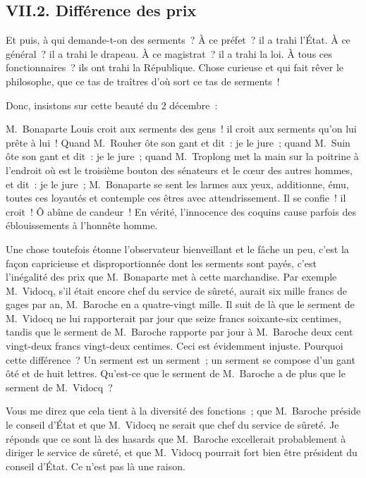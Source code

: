\documentclass[french,twoside]{book} %
\begin{document}
\subsection[{VII.2. Différence des prix}]{VII.2. Différence des prix}
\noindent Et puis, à qui demande-t-on des serments ? À ce préfet ? il a trahi l’État. À ce général ? il a trahi le drapeau. À ce magistrat ? il a trahi la loi. À tous ces fonctionnaires ? ils ont trahi la République. Chose curieuse et qui fait rêver le philosophe, que ce tas de traîtres d’où sort ce tas de serments !\par
Donc, insistons sur cette beauté du 2 décembre :\par
M. Bonaparte Louis croit aux serments des gens ! il croit aux serments qu’on lui prête à lui ! Quand M. Rouher ôte son gant et dit : je le jure ; quand M. Suin ôte son gant et dit : je le jure ; quand M. Troplong met la main sur la poitrine à l’endroit où est le troisième bouton des sénateurs et le cœur des autres hommes, et dit : je le jure ; M. Bonaparte se sent les larmes aux yeux, additionne, ému, toutes ces loyautés et contemple ces êtres avec attendrissement. Il se confie ! il croit ! Ô abîme de candeur ! En vérité, l’innocence des coquins cause parfois des éblouissements à l’honnête homme.\par
Une chose toutefois étonne l’observateur bienveillant et le fâche un peu, c’est la façon capricieuse et disproportionnée dont les serments sont payés, c’est l’inégalité des prix que M. Bonaparte met à cette marchandise. Par exemple M. Vidocq, s’il était encore chef du service de sûreté, aurait six mille francs de gages par an, M. Baroche en a quatre-vingt mille. Il suit de là que le serment de M. Vidocq ne lui rapporterait par jour que seize francs soixante-six centimes, tandis que le serment de M. Baroche rapporte par jour à M. Baroche deux cent vingt-deux francs vingt-deux centimes. Ceci est évidemment injuste. Pourquoi cette différence ? Un serment est un serment ; un serment se compose d’un gant ôté et de huit lettres. Qu’est-ce que le serment de M. Baroche a de plus que le serment de M. Vidocq ?\par
Vous me direz que cela tient à la diversité des fonctions ; que M. Baroche préside le conseil d’État et que M. Vidocq ne serait que chef du service de sûreté. Je réponds que ce sont là des hasards que M. Baroche excellerait probablement à diriger le service de sûreté, et que M. Vidocq pourrait fort bien être président du conseil d’État. Ce n’est pas là une raison.\par
\end{document}

